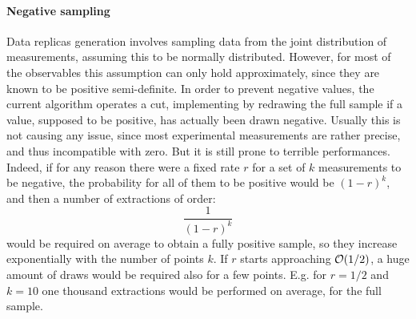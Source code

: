 \paragraph{Negative sampling} Data replicas generation involves sampling data
from the joint distribution of measurements, assuming this to be normally
distributed.
%
However, for most of the observables this assumption can only hold
approximately, since they are known to be positive semi-definite.
%
In order to prevent negative values, the current algorithm operates a cut,
implementing by redrawing the full sample if a value, supposed to be positive,
has actually been drawn negative.
%
Usually this is not causing any issue, since most experimental measurements are
rather precise, and thus incompatible with zero. But it is still prone to
terrible performances.
%
Indeed, if for any reason there were a fixed rate $r$ for a set of $k$
measurements to be negative, the probability for all of them to be positive
would be $(1-r)^k$, and then a number of extractions of order:
\begin{equation}
  \frac{1}{(1-r)^k}
\end{equation}
would be required on average to obtain a fully positive sample, so they
increase exponentially with the number of points $k$.
If $r$ starts approaching $\order{1/2}$, a huge amount of draws would be
required also for a few points. E.g. for $r = 1/2$ and $k = 10$ one thousand
extractions would be performed on average, for the full sample.

